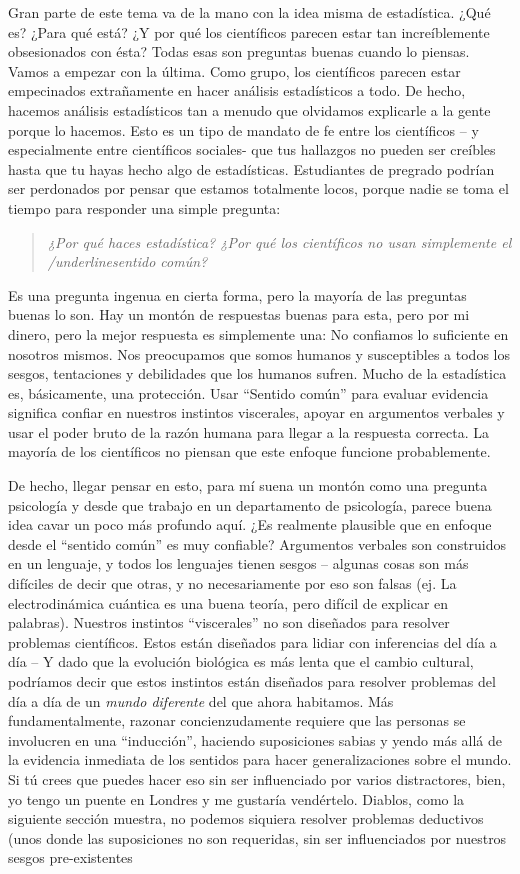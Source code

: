 Gran parte de este tema va de la mano con la idea misma de estadística. ¿Qué es?
¿Para qué está? ¿Y por qué los científicos parecen estar tan increíblemente 
obsesionados con ésta?  Todas esas son preguntas buenas cuando lo piensas. 
Vamos a empezar con la última. Como grupo, los científicos parecen estar 
empecinados extrañamente en hacer análisis estadísticos a todo. De hecho, 
hacemos análisis estadísticos tan a menudo que olvidamos explicarle a la gente 
porque lo hacemos. Esto es un tipo de mandato de fe entre los científicos – y 
especialmente entre científicos sociales- que tus hallazgos no pueden ser
creíbles hasta que tu hayas hecho algo de estadísticas. Estudiantes de pregrado
podrían ser perdonados por pensar que estamos totalmente locos, porque nadie se
toma el tiempo para responder una simple pregunta: 
\begin{quote}
{\it ¿Por qué haces estadística? ¿Por qué los científicos no usan simplemente el /underline{sentido común}?}
\end{quote}

Es una pregunta ingenua en cierta forma, pero la mayoría de las preguntas buenas lo son. Hay un montón de respuestas buenas para esta, pero por mi dinero, pero la mejor respuesta es simplemente una:  No confiamos lo suficiente en nosotros mismos. Nos preocupamos que somos humanos y susceptibles a todos los sesgos, tentaciones y debilidades que los humanos sufren. Mucho de la estadística es, básicamente, una protección. Usar “Sentido común” para evaluar evidencia significa confiar en nuestros instintos viscerales, apoyar en argumentos verbales y usar el poder bruto de la razón humana para llegar a la respuesta correcta. La mayoría de los científicos no piensan que este enfoque funcione probablemente.

De hecho, llegar pensar en esto, para mí suena un montón como una pregunta psicología y desde que trabajo en un departamento de psicología, parece buena idea cavar un poco más profundo aquí. ¿Es realmente plausible que en enfoque desde el “sentido común” es muy confiable? Argumentos verbales son construidos en un lenguaje, y todos los lenguajes tienen sesgos -- algunas cosas son más difíciles de decir que otras, y no necesariamente por eso son falsas (ej. La electrodinámica cuántica es una buena teoría, pero difícil de explicar en palabras). Nuestros instintos “viscerales” no son diseñados para resolver problemas científicos. Estos están diseñados para lidiar con inferencias del día a día -- Y dado que la evolución biológica es más lenta que el cambio cultural, podríamos decir que estos instintos están diseñados para resolver problemas del día a día de un {\it mundo diferente} del que ahora habitamos. Más fundamentalmente, razonar concienzudamente requiere que las personas se involucren en una ``inducción'', haciendo suposiciones sabias y yendo más allá de la evidencia inmediata de los sentidos para hacer generalizaciones sobre el mundo. Si tú crees que puedes hacer eso sin ser influenciado por varios distractores, bien, yo tengo un puente en Londres y me gustaría vendértelo. Diablos, como la siguiente sección muestra, no podemos siquiera resolver problemas deductivos (unos donde las suposiciones no son requeridas, sin ser influenciados por nuestros sesgos pre-existentes


